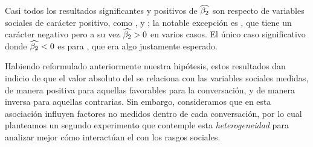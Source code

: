 Casi todos los resultados significantes y positivos de $\widehat{\beta_2}$ son respecto de variables sociales de carácter positivo, como \svclear, \svengaged y \svencourages; la notable excepción es \svdifficult, que tiene un carácter negativo pero a su vez $\widehat{\beta_2} > 0$ en varios casos. El único caso significativo donde $\widehat{\beta_2} < 0$ es para \svbored, que era algo justamente esperado.

Habiendo reformulado anteriormente nuestra hipótesis, estos resultados dan indicio de que el valor absoluto del \entrainment se relaciona con las variables sociales medidas, de manera positiva para aquellas favorables para la conversación, y de manera inversa para aquellas contrarias. Sin embargo, consideramos que en esta asociación influyen factores no medidos dentro de cada conversación, por lo cual planteamos un segundo experimento que contemple esta \emph{heterogeneidad} para analizar mejor cómo interactúan el \entrainment con los rasgos sociales.





